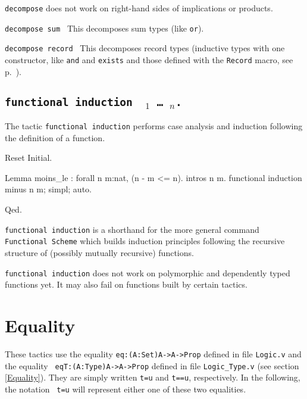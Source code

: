 {\tt decompose} does not work on right-hand sides of implications or products.

\begin{Variants}
  
\item {\tt decompose sum \term}
  This decomposes sum types (like \texttt{or}).
\item {\tt decompose record \term}
  This decomposes record types (inductive types with one constructor,
  like \texttt{and} and \texttt{exists} and those defined with the
  \texttt{Record} macro, see p.~\pageref{Record}).
\end{Variants}


\subsection{\tt functional induction \ident\ \term$_1$ \dots\ \term$_n$.}
\label{FunInduction}

The tactic \texttt{functional induction} performs case analysis
and induction following the definition of a function.

\begin{coq_eval}
Reset Initial.
\end{coq_eval}
\begin{coq_example}
Lemma moins_le : forall n m:nat, (n - m <= n).
intros n m.
functional induction minus n m; simpl; auto.
\end{coq_example}
\begin{coq_example*}
Qed.
\end{coq_example*}

\texttt{functional induction} is a shorthand for the more general
command \texttt{Functional Scheme} which builds induction
principles following the recursive structure of (possibly
mutually recursive) functions.

\Rem \texttt{functional induction} does not work on polymorphic
and dependently typed functions yet. It may also fail on
functions built by certain tactics.

\SeeAlso{\ref{FunScheme},\ref{FunScheme-examples}}

\section{Equality}

These tactics use the equality {\tt eq:(A:Set)A->A->Prop} defined
in file {\tt Logic.v} and the equality {\tt
  eqT:(A:Type)A->A->Prop} defined in file {\tt Logic\_Type.v} (see
section \ref{Equality}). They are simply written {\tt t=u} and
{\tt t==u}, respectively.  In the following, the notation {\tt
  t=u} will represent either one of these two equalities.

